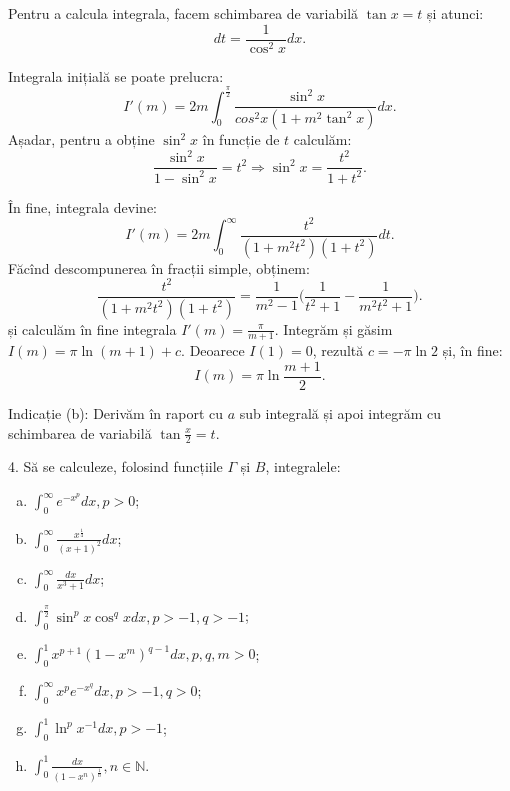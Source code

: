 \documentclass[11pt,a4paper]{article}
\newcommand\ds{\displaystyle}
\newcommand\NN{\mathbb{N}}
\theoremstyle{dotless}
\theoremstyle{dotlessdr}
\begin{document}
Pentru a calcula integrala, facem schimbarea de variabilă $\tan x = t$ și atunci:
\[
  dt = \frac{1}{\cos^2 x} dx.
\]

Integrala inițială se poate prelucra:
\[
  I'(m) = 2m \int_0^{\frac{\pi}{2}} \frac{\sin^2 x}{cos^2 x(1 + m^2 \tan^2 x)} dx.
\]
Așadar, pentru a obține $\sin^2 x$ în funcție de $t$ calculăm:
\[
  \frac{\sin^2 x}{1 - \sin^2 x} = t^2 \Rightarrow \sin^2 x = \frac{t^2}{1 + t^2}.
\]

În fine, integrala devine:
\[
  I'(m) = 2m \int_0^\infty \frac{t^2}{(1 + m^2 t^2)(1 + t^2)} dt.
\]
Făcînd descompunerea în fracții simple, obținem:
\[
  \frac{t^2}{(1 + m^2 t^2)(1 + t^2)} = \frac{1}{m^2 - 1} \Big( \frac{1}{t^2 + 1} - %
  \frac{1}{m^2 t^2 + 1} \Big).
\]
și calculăm în fine integrala $I'(m) = \frac{\pi}{m + 1}$. Integrăm și găsim
$I(m) = \pi \ln(m + 1) + c$. Deoarece $I(1) = 0$, rezultă $c = -\pi \ln 2$
și, în fine:
\[
  I(m) = \pi \ln \frac{m + 1}{2}.
\]

\vspace{1cm}

Indicație (b): Derivăm în raport cu $a$ sub integrală și apoi integrăm cu schimbarea de variabilă
$\tan \frac{x}{2} = t$.

\vspace{1cm}

4. Să se calculeze, folosind funcțiile $\Gamma$ și $B$, integralele:
\begin{enumerate}[(a)]
\item $\ds\int_0^\infty e^{-x^p} dx, p > 0$;
\item $\ds\int_0^{\infty} \frac{x^{\frac{1}{4}}}{(x + 1)^2} dx$;
\item $\ds\int_0^\infty \frac{dx}{x^3 + 1} dx$;
\item $\ds\int_0^{\frac{\pi}{2}} \sin^p x \cos^q x dx, p > -1, q > - 1$;
\item $\ds\int_0^1 x^{p+1}(1-x^m)^{q - 1} dx, p, q, m > 0$;
\item $\ds\int_0^\infty x^p e^{-x^q} dx, p > -1, q > 0$;
\item $\ds\int_0^1 \ln^p x^{-1} dx, p > -1$;
\item $\ds\int_0^1 \frac{dx}{(1 - x^n)^{\frac{1}{n}}}, n \in \NN$.
\end{enumerate}
\end{document}
